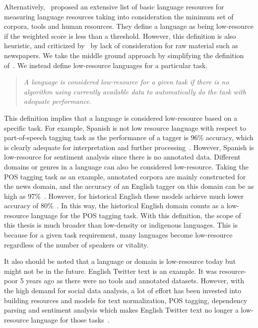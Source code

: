 \documentclass[12pt,twoside,final,hidelinks]{ltthesis}
\theoremstyle{definition}
\begin{document}
Alternatively,~ proposed an extensive list of basic language resources for 
measuring language resources taking into consideration the minimum set of corpora, tools and human resources. They define a language as being low-resource if the weighted score is less than a threshold. However, this definition is also heuristic, and criticized by~ by lack of consideration for raw material such as newspapers. 
We take the middle ground approach by simplifying the definition of~. 
We instead define low-resource languages for a particular task. 
\begin{quote}
\textit{A language is considered low-resource for a given task if there is no algorithm using currently available data to automatically do the task 
with adequate performance.}
\end{quote}
This definition implies that a language is considered low-resource based on a specific task. 
For example, Spanish is not low resource language with respect to 
part-of-speech tagging task as the performance of a tagger is 96\% accuracy, which is clearly adequate for interpretation 
and further processing~\cite{UniversalTagSet}. However, Spanish is 
low-resource for sentiment analysis 
since  there is no annotated data. 
Different domains or genres in a language can also be considered low-resource. 
Taking the POS tagging task as an example, annotated corpora are mainly 
constructed for the news domain, and the accuracy of an English tagger on this domain 
can be as high as 97\%~\cite{Toutanova:2003}. However, for historical English 
these models achieve much lower accuracy of 80\%~\cite{yang-eisenstein:2016:N16-1}. In this way, 
the historical English domain counts as a  low-resource language for the POS tagging task. 
With this definition, the scope of this thesis is much broader than low-density or indigenous languages. 
This is because for a given task requirement, many languages become low-resource regardless of the number of speakers or vitality.%

It also should be noted that a language or domain is low-resource today but might not be in the future. English Twitter text is an example. It was resource-poor 5 years ago as there were no tools and annotated datasets. However, with the high demand for social data analysis, a lot of effort has been invested into building resources and models for text normalization, POS tagging, dependency parsing and sentiment analysis which makes English Twitter text no longer a low-resource language for those tasks~\cite{han-baldwin:2011:ACL-HLT2011,gimpel-EtAl:2011:ACL-HLT2011,kong-EtAl:2014:EMNLP2014,Agarwal:2011:SAT:2021109.2021114}. 
\end{document}
